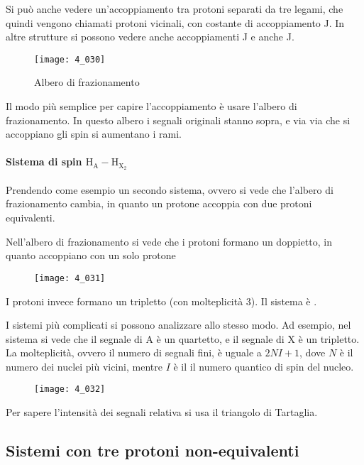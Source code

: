 Si può anche vedere un'accoppiamento tra protoni separati da tre legami, che quindi vengono chiamati protoni vicinali, con costante di accoppiamento J.
In altre strutture si possono vedere anche accoppiamenti J e anche J.

\begin{figure}[H]
  \texttt{[image: 4\_030]}
  \caption{Albero di frazionamento}
\end{figure}

Il modo più semplice per capire l'accoppiamento è usare l'albero di frazionamento. In questo albero i segnali originali stanno sopra, e via via che si accoppiano gli spin si aumentano i rami.

\paragraph{Sistema di spin $\text{H}_{\text{A}} - \text{H}_{\text{X}_2}$}

Prendendo come esempio un secondo sistema, ovvero  si vede che l'albero di frazionamento cambia, in quanto un protone accoppia con due protoni equivalenti.

Nell'albero di frazionamento si vede che i protoni  formano un doppietto, in quanto accoppiano con un solo protone

\begin{figure}[H]
  \texttt{[image: 4\_031]}
\end{figure}

I protoni  invece formano un tripletto (con molteplicità 3). Il sistema è .

I sistemi più complicati si possono analizzare allo stesso modo. Ad esempio, nel sistema  si vede che il segnale di A è un quartetto, e il
segnale di X è un tripletto.
La molteplicità, ovvero il numero di segnali fini, è uguale a \(2NI+1\), dove $N$ è il numero dei nuclei più vicini, mentre $I$ è il il numero quantico di spin del nucleo.
\begin{figure}[H]
  \texttt{[image: 4\_032]}
\end{figure}

Per sapere l'intensità dei segnali relativa si usa il triangolo di Tartaglia.

\subsection{Sistemi con tre protoni non-equivalenti}


